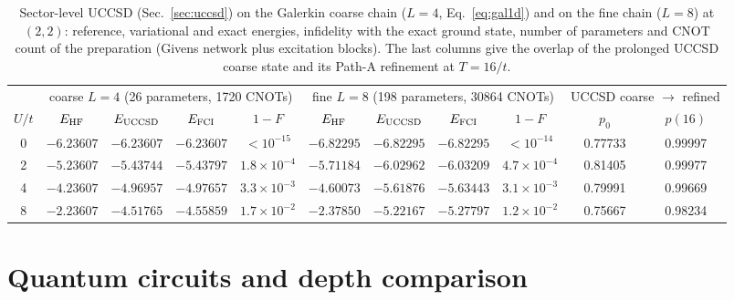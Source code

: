 \documentclass[
  aps,
  prc,
  reprint,
  superscriptaddress,
  floatfix,
  nofootinbib
]{revtex4-2}
\begin{document}
\begin{table}[t]
  \caption{Sector-level UCCSD (Sec.~\ref{sec:uccsd}) on the Galerkin coarse
  chain ($L=4$, Eq.~\eqref{eq:gal1d}) and on the fine chain ($L=8$) at $(2,2)$:
  reference, variational and exact energies, infidelity with the exact ground
  state, number of parameters and CNOT count of the preparation (Givens
  network plus excitation blocks).  The last columns give the overlap of the
  prolonged UCCSD coarse state and its Path-A refinement at $T=16/t$.}
  \label{tab:uccsd}
  \begin{ruledtabular}
  \begin{tabular}{c|cccc|cccc|cc}
  & \multicolumn{4}{c|}{coarse $L=4$ (26 parameters, 1720 CNOTs)} & \multicolumn{4}{c|}{fine $L=8$ (198 parameters, 30864 CNOTs)} & \multicolumn{2}{c}{UCCSD coarse $\to$ refined}\\
  $U/t$ & $E_{\rm HF}$ & $E_{\rm UCCSD}$ & $E_{\rm FCI}$ & $1-F$ & $E_{\rm HF}$ & $E_{\rm UCCSD}$ & $E_{\rm FCI}$ & $1-F$ & $p_0$ & $p(16)$\\
  \hline
  0 & $-6.23607$ & $-6.23607$ & $-6.23607$ & $<10^{-15}$ & $-6.82295$ & $-6.82295$ & $-6.82295$ & $<10^{-14}$ & 0.77733 & 0.99997\\
  2 & $-5.23607$ & $-5.43744$ & $-5.43797$ & $1.8\times10^{-4}$ & $-5.71184$ & $-6.02962$ & $-6.03209$ & $4.7\times10^{-4}$ & 0.81405 & 0.99977\\
  4 & $-4.23607$ & $-4.96957$ & $-4.97657$ & $3.3\times10^{-3}$ & $-4.60073$ & $-5.61876$ & $-5.63443$ & $3.1\times10^{-3}$ & 0.79991 & 0.99669\\
  8 & $-2.23607$ & $-4.51765$ & $-4.55859$ & $1.7\times10^{-2}$ & $-2.37850$ & $-5.22167$ & $-5.27797$ & $1.2\times10^{-2}$ & 0.75667 & 0.98234\\
  \end{tabular}
  \end{ruledtabular}
\end{table}

\section{Quantum circuits and depth comparison}
\label{sec:circuits}
\end{document}
